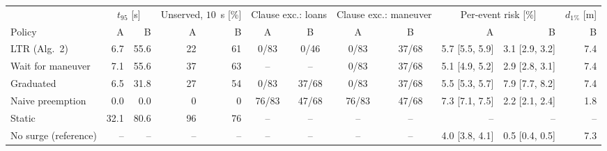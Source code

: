 \begin{tabular}{@{}l r r r r c c c c r r r@{}}
\toprule
 & \multicolumn{2}{c}{$t_{95}$ [s]} & \multicolumn{2}{c}{Unserved, $10$~s [\%]} & \multicolumn{2}{c}{Clause exc.: loans} & \multicolumn{2}{c}{Clause exc.: maneuver} & \multicolumn{2}{c}{Per-event risk [\%]} & $d_{1\%}$ [m]\\
\cmidrule(lr){2-3}\cmidrule(lr){4-5}\cmidrule(lr){6-7}\cmidrule(lr){8-9}\cmidrule(lr){10-11}\cmidrule(l){12-12}
Policy & A & B & A & B & A & B & A & B & A & B & B\\
\midrule
LTR (Alg.~2) & 6.7 & 55.6 & 22 & 61 & 0/83 & 0/46 & 0/83 & 37/68 & 5.7 {\scriptsize[5.5, 5.9]} & 3.1 {\scriptsize[2.9, 3.2]} & 7.4\\
Wait for maneuver & 7.1 & 55.6 & 37 & 63 & -- & -- & 0/83 & 37/68 & 5.1 {\scriptsize[4.9, 5.2]} & 2.9 {\scriptsize[2.8, 3.1]} & 7.4\\
Graduated & 6.5 & 31.8 & 27 & 54 & 0/83 & 37/68 & 0/83 & 37/68 & 5.5 {\scriptsize[5.3, 5.7]} & 7.9 {\scriptsize[7.7, 8.2]} & 7.4\\
Naive preemption & 0.0 & 0.0 & 0 & 0 & 76/83 & 47/68 & 76/83 & 47/68 & 7.3 {\scriptsize[7.1, 7.5]} & 2.2 {\scriptsize[2.1, 2.4]} & 1.8\\
Static & 32.1 & 80.6 & 96 & 76 & -- & -- & -- & -- & -- & -- & --\\
No surge (reference) & -- & -- & -- & -- & -- & -- & -- & -- & 4.0 {\scriptsize[3.8, 4.1]} & 0.5 {\scriptsize[0.4, 0.5]} & 7.3\\
\bottomrule
\end{tabular}
